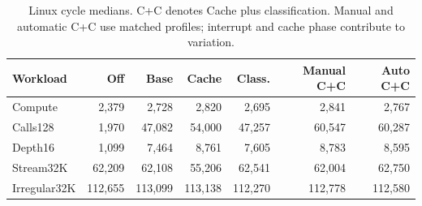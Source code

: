\begin{table}[t]\centering\small
\begin{tabular}{lrrrrrr}\toprule
Workload & Off & Base & Cache & Class. & Manual C+C & Auto C+C\\\midrule
Compute & 2,379 & 2,728 & 2,820 & 2,695 & 2,841 & 2,767\\
Calls128 & 1,970 & 47,082 & 54,000 & 47,257 & 60,547 & 60,287\\
Depth16 & 1,099 & 7,464 & 8,761 & 7,605 & 8,783 & 8,595\\
Stream32K & 62,209 & 62,108 & 55,206 & 62,541 & 62,004 & 62,750\\
Irregular32K & 112,655 & 113,099 & 113,138 & 112,270 & 112,778 & 112,580\\
\bottomrule\end{tabular}
\caption{Linux cycle medians. C+C denotes Cache plus classification. Manual and automatic C+C use matched profiles; interrupt and cache phase contribute to variation.}\label{tab:linuxcycles}
\end{table}
